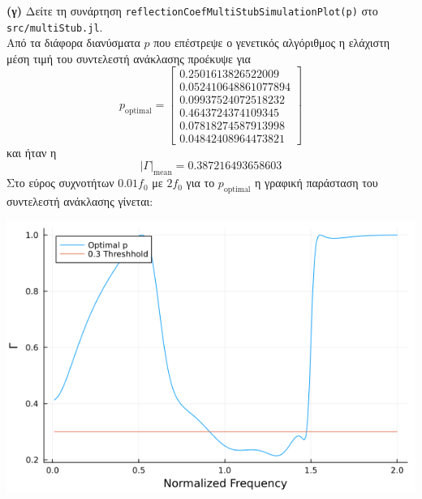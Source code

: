 \documentclass[12pt]{article}
\begin{document}
\bigskip
\textbf{(γ)} 
Δείτε τη συνάρτηση \texttt{reflectionCoefMultiStubSimulationPlot(p)} στο \texttt{src/multiStub.jl}.  \\
Από τα διάφορα διανύσματα \(p\) που επέστρεψε ο γενετικός αλγόριθμος η ελάχιστη μέση τιμή του συντελεστή ανάκλασης προέκυψε για  
\[
    p_{\text{optimal}} = 
    \begin{bmatrix}
         0.2501613826522009 \\
 0.052410648861077894 \\
 0.09937524072518232  \\
 0.4643724374109345 \\
 0.07818274587913998 \\
 0.04842408964473821
    \end{bmatrix}
\] 
και ήταν η 
\[
    |\Gamma|_\text{mean} = 0.387216493658603
\]
Στο εύρος συχνοτήτων \(0.01f_0\) με \(2f_0\) για το \(p_{\text{optimal}}\)
η γραφική παράσταση του συντελεστή ανάκλασης γίνεται: 
\begin{center}
    \includegraphics*[scale=0.6]{1-4-c.png}
\end{center}
\end{document}
